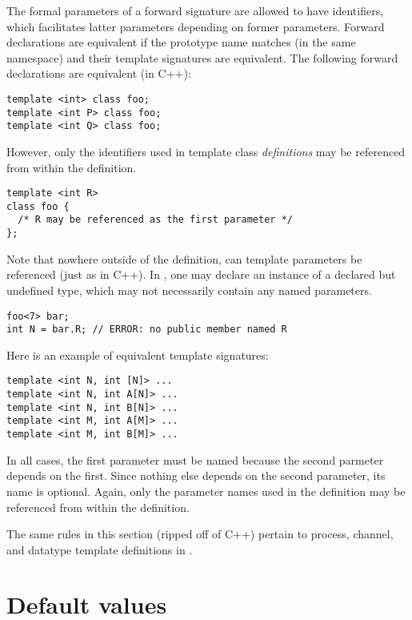 The formal parameters of a forward signature are allowed to have identifiers, 
which facilitates latter parameters depending on former parameters.  
Forward declarations are equivalent if the prototype name matches (in the
same namespace) and their template signatures are equivalent.  
The following forward declarations are equivalent (in C++):

\begin{verbatim}
template <int> class foo;
template <int P> class foo;
template <int Q> class foo;
\end{verbatim}

However, only the identifiers used in template class \emph{definitions}
may be referenced from within the definition.  

\begin{verbatim}
template <int R>
class foo {
  /* R may be referenced as the first parameter */
};
\end{verbatim}

Note that nowhere outside of the definition, 
can template parameters be referenced (just as in C++).  
In \hac, one may declare an instance of a declared but undefined type, 
which may not necessarily contain any named parameters.  

\begin{verbatim}
foo<7> bar;
int N = bar.R; // ERROR: no public member named R
\end{verbatim}

Here is an example of equivalent template signatures:

\begin{verbatim}
template <int N, int [N]> ...
template <int N, int A[N]> ...
template <int N, int B[N]> ...
template <int M, int A[M]> ...
template <int M, int B[M]> ...
\end{verbatim}

In all cases, the first parameter must be named because the second
parmeter depends on the first.  
Since nothing else depends on the second parameter, its name is optional.  
Again, only the parameter names used in the definition 
may be referenced from within the definition.  

The same rules in this section (ripped off of C++) pertain to
process, channel, and datatype template definitions in \hac.


\section{Default values}
\label{sec:templates:default}

